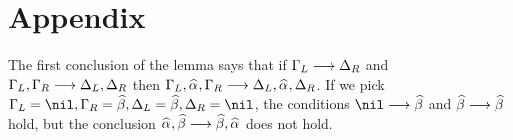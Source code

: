 \documentclass[acmsmall,review,anonymous]{acmart}\settopmatter{printfolios=true,printccs=false,printacmref=false}
\begin{document}



\appendix
\section{Appendix}

The first conclusion of the lemma says that if $\Gamma_L\longrightarrow \Delta_R$ and
$\Gamma_L,\Gamma_R\longrightarrow \Delta_L,\Delta_R$ then
$\Gm_L,\al,\Gm_R\longrightarrow \Delta_L,\al,\Delta_R$.
If we pick $\Gm_L = \nil, \Gm_R = \bt, \Delta_L = \bt, \Delta_R = \nil$, the conditions
$\nil\longrightarrow \bt$ and $\bt\longrightarrow \bt$ hold, but the conclusion
$\al,\bt \longrightarrow \bt,\al$ does not hold.
\end{document}
